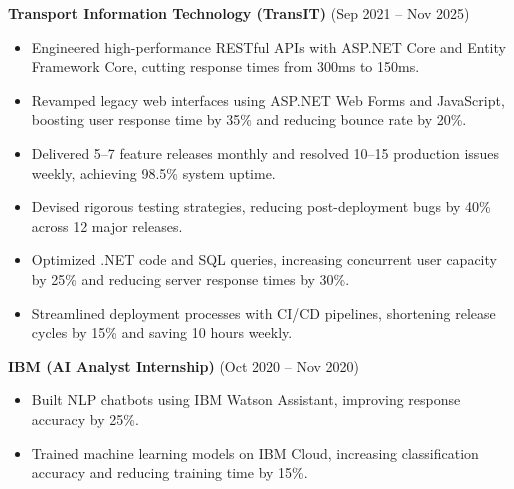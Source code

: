 \documentclass[11pt,a4paper]{article}
\begin{document}
\textbf{Transport Information Technology (TransIT)} (Sep 2021 -- Nov 2025)
\begin{itemize}
    \item Engineered high-performance RESTful APIs with ASP.NET Core and Entity Framework Core, cutting response times from 300ms to 150ms.
    \item Revamped legacy web interfaces using ASP.NET Web Forms and JavaScript, boosting user response time by 35\% and reducing bounce rate by 20\%.
    \item Delivered 5--7 feature releases monthly and resolved 10--15 production issues weekly, achieving 98.5\% system uptime.
    \item Devised rigorous testing strategies, reducing post-deployment bugs by 40\% across 12 major releases.
    \item Optimized .NET code and SQL queries, increasing concurrent user capacity by 25\% and reducing server response times by 30\%.
    \item Streamlined deployment processes with CI/CD pipelines, shortening release cycles by 15\% and saving 10 hours weekly.
\end{itemize}

\textbf{IBM (AI Analyst Internship)} (Oct 2020 -- Nov 2020)
\begin{itemize}
    \item Built NLP chatbots using IBM Watson Assistant, improving response accuracy by 25\%.
    \item Trained machine learning models on IBM Cloud, increasing classification accuracy and reducing training time by 15\%.
\end{itemize}
\end{document}
